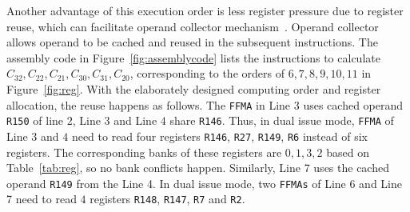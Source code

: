 Another advantage of this execution order is less register pressure due to register reuse, which can facilitate
operand collector mechanism~\cite{collector}. Operand collector allows operand to be cached and reused in the subsequent instructions.
The assembly code in Figure~\ref{fig:assemblycode} lists the instructions to calculate $C_{32},C_{22}, C_{21}, C_{30},
C_{31}, C_{20}$, corresponding to the orders of $6,7,8,9,10,11$ in Figure~\ref{fig:reg}.
With the elaborately designed computing order and register allocation, the reuse happens as follows. The {\tt FFMA} in
Line $3$ uses cached operand {\tt R150} of line $2$, Line $3$ and Line $4$ share {\tt R146}. Thus, in dual issue mode,
{\tt FFMA} of Line $3$ and $4$ need to read four registers {\tt R146}, {\tt R27}, {\tt R149}, {\tt R6} instead of six
registers. The corresponding banks of these registers are $0,1,3,2$ based on Table~\ref{tab:reg}, so no bank conflicts happen.
Similarly, Line 7 uses the cached operand {\tt R149} from the Line 4. In dual issue mode, two {\tt FFMAs} of Line 6 and
Line 7 need to read $4$ registers {\tt R148}, {\tt R147}, {\tt R7} and {\tt R2}.
